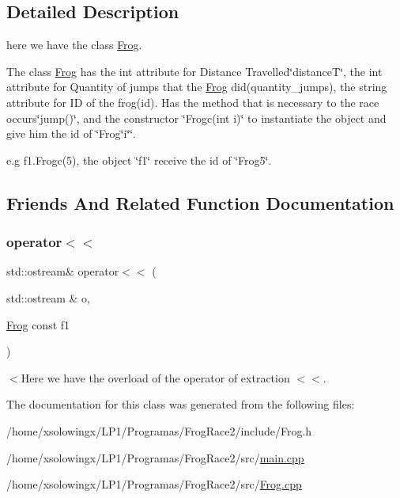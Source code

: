 \subsection{Detailed Description}
here we have the class \hyperlink{classFrog}{Frog}. 

The class \hyperlink{classFrog}{Frog} has the int attribute for Distance Travelled\char`\"{}distance\+T\char`\"{}, the int attribute for Quantity of jumps that the \hyperlink{classFrog}{Frog} did(quantity\+\_\+jumps), the string attribute for ID of the frog(id). Has the method that is necessary to the race occurs\char`\"{}jump()\char`\"{}, and the constructor \char`\"{}\+Frogc(int i)\char`\"{} to instantiate the object and give him the id of \char`\"{}\+Frog\char`\"{}i\char`\"{}\char`\"{}.

e.\+g f1.\+Frogc(5), the object \char`\"{}f1\char`\"{} receive the id of \char`\"{}\+Frog5\char`\"{}. 

\subsection{Friends And Related Function Documentation}
\mbox{\label{classFrog_a63caf8bfed035c0ecc5f3954119f34c2}} 
\subsubsection{\texorpdfstring{operator$<$$<$}{operator<<}}
{\footnotesize\ttfamily std\+::ostream\& operator$<$$<$ (\begin{DoxyParamCaption}\item[{std\+::ostream \&}]{o,  }\item[{\hyperlink{classFrog}{Frog} const}]{f1 }\end{DoxyParamCaption})\hspace{0.3cm}{\ttfamily [friend]}}

$<$Here we have the overload of the operator of extraction $<$$<$. 

The documentation for this class was generated from the following files\+:\begin{DoxyCompactItemize}
\item 
/home/xsolowingx/\+L\+P1/\+Programas/\+Frog\+Race2/include/Frog.\+h\item 
/home/xsolowingx/\+L\+P1/\+Programas/\+Frog\+Race2/src/\hyperlink{main_8cpp}{main.\+cpp}\item 
/home/xsolowingx/\+L\+P1/\+Programas/\+Frog\+Race2/src/\hyperlink{Frog_8cpp}{Frog.\+cpp}\end{DoxyCompactItemize}
